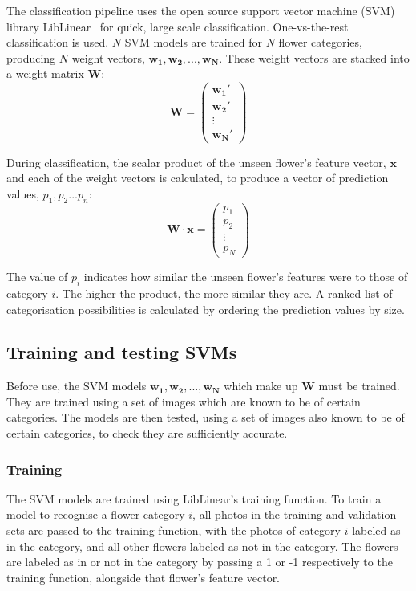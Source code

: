 \documentclass[11pt, a4paper]{report}
\newcommand{\vect}[1]{\boldsymbol{#1}}
\begin{document}
The classification pipeline uses the open source support vector machine (SVM) library LibLinear~\cite{REF08a} for quick, large scale classification. One-vs-the-rest classification is used. $N$ SVM models are trained for $N$ flower categories, producing $N$ weight vectors, $\vect{w_{1}}, \vect{w_{2}}, ..., \vect{w_{N}}$. These weight vectors are stacked into a weight matrix $\vect{W}$: 
$$
\vect{W} = 
\begin{pmatrix}
\vect{w_{1}'}\\  
\vect{w_{2}'}\\ 
\vdots \\ 
\vect{w_{N}'}
\end{pmatrix}
$$



During classification, the scalar product of the unseen flower's feature vector, $\vect{x}$ and each of the weight vectors is calculated, to produce a vector of prediction values, $p_{1}, p_{2} ... p_{n}$:
$$
\vect{W} \cdot \vect{x} =
\begin{pmatrix}
p_{1}\\  
p_{2}\\ 
\vdots \\ 
p_{N}
\end{pmatrix}
$$

The value of $p_{i}$ indicates how similar the unseen flower's features were to those of category $i$. The higher the product, the more similar they are. A ranked list of categorisation possibilities is calculated by ordering the prediction values by size. 


\subsection{Training and testing SVMs}

Before use, the SVM models $\vect{w_{1}}, \vect{w_{2}}, ..., \vect{w_{N}}$ which make up $\vect{W}$ must be trained. They are trained using a set of images which are known to be of certain categories. The models are then tested, using a set of images also known to be of certain categories, to check they are sufficiently accurate.


\subsubsection{Training} 

The SVM models are trained using LibLinear's training function. To train a model to recognise a flower category $i$, all photos in the training and validation sets are passed to the training function, with the photos of category $i$ labeled as in the category, and all other flowers labeled as not in the category. The flowers are labeled as in or not in the category by passing a 1 or -1 respectively to the training function, alongside that flower's feature vector.
\end{document}
